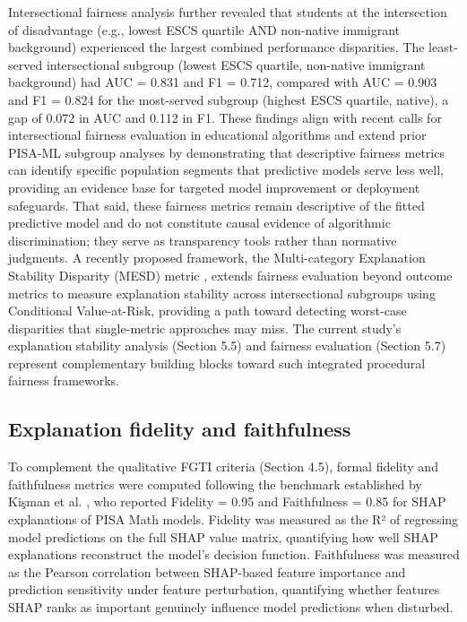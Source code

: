 \documentclass[pdflatex,sn-mathphys-ay]{sn-jnl}
\begin{document}
Intersectional fairness analysis further revealed that students at the intersection of disadvantage (e.g., lowest ESCS quartile AND non-native immigrant background) experienced the largest combined performance disparities. The least-served intersectional subgroup (lowest ESCS quartile, non-native immigrant background) had AUC = 0.831 and F1 = 0.712, compared with AUC = 0.903 and F1 = 0.824 for the most-served subgroup (highest ESCS quartile, native), a gap of 0.072 in AUC and 0.112 in F1. These findings align with recent calls for intersectional fairness evaluation in educational algorithms \citep{Idowu_2024_debiasing,Verger_2024_MADD} and extend prior PISA-ML subgroup analyses \citep{Cheung_2024_resilience,Li_2025} by demonstrating that descriptive fairness metrics can identify specific population segments that predictive models serve less well, providing an evidence base for targeted model improvement or deployment safeguards. That said, these fairness metrics remain descriptive of the fitted predictive model and do not constitute causal evidence of algorithmic discrimination; they serve as transparency tools rather than normative judgments. A recently proposed framework, the Multi-category Explanation Stability Disparity (MESD) metric \citep{Popoola_Sheppard_2026_MESD}, extends fairness evaluation beyond outcome metrics to measure explanation stability across intersectional subgroups using Conditional Value-at-Risk, providing a path toward detecting worst-case disparities that single-metric approaches may miss. The current study's explanation stability analysis (Section 5.5) and fairness evaluation (Section 5.7) represent complementary building blocks toward such integrated procedural fairness frameworks.

\subsection{Explanation fidelity and faithfulness}

To complement the qualitative FGTI criteria (Section 4.5), formal fidelity and faithfulness metrics were computed following the benchmark established by Kişman et al. \citep{Kisman_2026}, who reported Fidelity = 0.95 and Faithfulness = 0.85 for SHAP explanations of PISA Math models. Fidelity was measured as the R² of regressing model predictions on the full SHAP value matrix, quantifying how well SHAP explanations reconstruct the model's decision function. Faithfulness was measured as the Pearson correlation between SHAP-based feature importance and prediction sensitivity under feature perturbation, quantifying whether features SHAP ranks as important genuinely influence model predictions when disturbed.
\end{document}
